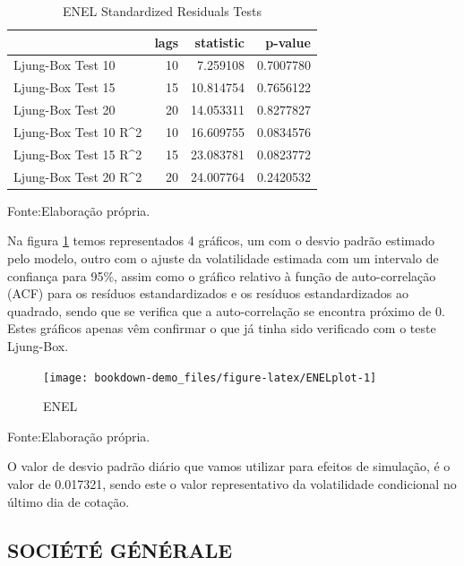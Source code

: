 \documentclass[
  12pt,
  a4paper,
  openany]{book}
\begin{document}
\begin{table}[!h]

\caption{\label{tab:ENELLjunk}ENEL Standardized Residuals Tests}
\centering
\begin{tabular}[t]{lrrr}
\toprule
  & lags & statistic & p-value\\
\midrule
Ljung-Box Test 10 & 10 & 7.259108 & 0.7007780\\
Ljung-Box Test 15 & 15 & 10.814754 & 0.7656122\\
Ljung-Box Test 20 & 20 & 14.053311 & 0.8277827\\
Ljung-Box Test 10 R\textasciicircum{}2 & 10 & 16.609755 & 0.0834576\\
Ljung-Box Test 15 R\textasciicircum{}2 & 15 & 23.083781 & 0.0823772\\
\addlinespace
Ljung-Box Test 20 R\textasciicircum{}2 & 20 & 24.007764 & 0.2420532\\
\bottomrule
\end{tabular}
\end{table}
\FloatBarrier
\centering

Fonte:Elaboração própria.

\justifying
\bigskip

Na figura \ref{fig:ENELplot} temos representados 4 gráficos, um com o desvio padrão estimado pelo modelo, outro com o ajuste da volatilidade estimada com um intervalo de confiança para 95\%, assim como o gráfico relativo à função de auto-correlação (ACF) para os resíduos estandardizados e os resíduos estandardizados ao quadrado, sendo que se verifica que a auto-correlação se encontra próximo de 0. Estes gráficos apenas vêm confirmar o que já tinha sido verificado com o teste Ljung-Box.

\begin{figure}

{\centering \texttt{[image: bookdown-demo\_files/figure-latex/ENELplot-1]} 

}

\caption{ENEL}\label{fig:ENELplot}
\end{figure}
\FloatBarrier
\centering

Fonte:Elaboração própria.

\justifying
\bigskip

O valor de desvio padrão diário que vamos utilizar para efeitos de simulação, é o valor de 0.017321, sendo este o valor representativo da volatilidade condicional no último dia de cotação.

\hypertarget{sociuxe9tuxe9-guxe9nuxe9rale}{%
\subsection{SOCIÉTÉ GÉNÉRALE}\label{sociuxe9tuxe9-guxe9nuxe9rale}}
\end{document}
